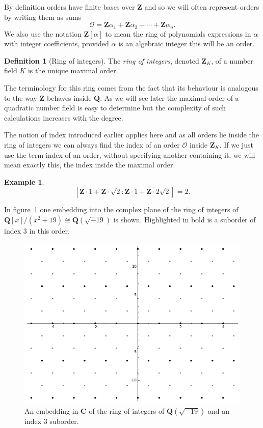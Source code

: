 \documentclass[12pt,a4paper,abstracton,bibtotoc]{scrreprt}
\theoremstyle{definition}
\newtheorem{defn}{Definition}
\newtheorem{ex}{Example}
\newcommand{\QQ}{\mathbf{Q}}
\newcommand{\CC}{\mathbf{C}}
\newcommand{\ZZ}{\mathbf{Z}}
\renewcommand{\O}{\mathcal{O}}
\begin{document}
By definition orders have finite bases over $\ZZ$ and so we will often represent orders by writing them as sums 
\[
\O = \ZZ\alpha_1 + \ZZ \alpha_2 + \cdots + \ZZ \alpha_n.
\]
We also use the notation $\ZZ[\alpha]$ to mean the ring of polynomials expressions in $\alpha$ with integer coefficients, provided $\alpha$ is an algebraic integer this will be an order.

\begin{defn}[Ring of integers]
The \emph{ring of integers}, denoted $\ZZ_K$, of a number field $K$ is the unique maximal order.
\end{defn}

The terminology for this ring comes from the fact that its behaviour is analogous to the way $\ZZ$ behaves inside $\QQ$.
As we will see later the maximal order of a quadratic number field is easy to determine but the complexity of such calculations increases with the degree.

The notion of index introduced earlier applies here and as all orders lie inside the ring of integers we can always find the index of an order $\O$ inside $\ZZ_K$.
If we just use the term index of an order, without specifying another containing it, we will mean exactly this, the index inside the maximal order.

\begin{ex}
\[
[\ZZ\cdot 1 + \ZZ\cdot \sqrt{2} : \ZZ \cdot 1 + \ZZ \cdot 2\sqrt{2}] = 2.
\]
\end{ex}

In figure~\ref{fig:sageord} one embedding into the complex plane of the ring of integers of $\QQ[x]/(x^2 + 19)\cong \QQ(\sqrt{-19})$ is shown.
Highlighted in bold is a suborder of index 3 in this order.
\begin{figure}
\centering
\includegraphics[scale=0.6]{sageord}
\caption{\label{fig:sageord} An embedding in $\CC$ of the ring of integers of $\QQ(\sqrt{-19})$ and an index 3 suborder.}
\end{figure}
\end{document}
